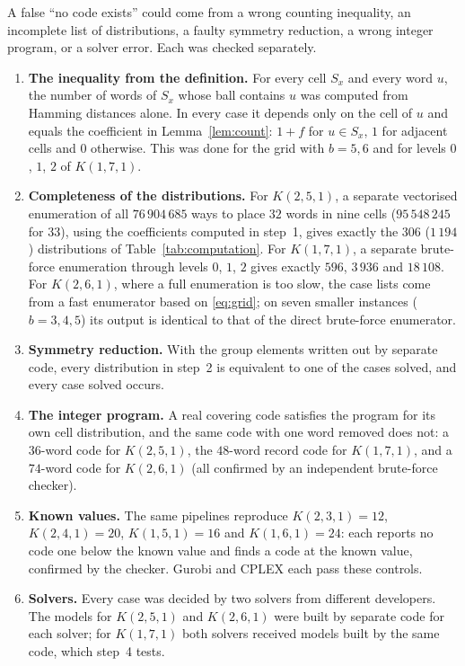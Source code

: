 \documentclass[11pt]{article}
\theoremstyle{remark}
\begin{document}
A false ``no code exists'' could come from a wrong counting inequality, an incomplete list of
distributions, a faulty symmetry reduction, a wrong integer program, or a solver error. Each was
checked separately.
\begin{enumerate}
\item \textbf{The inequality from the definition.} For every cell $S_x$ and every word $u$, the
  number of words of $S_x$ whose ball contains $u$ was computed from Hamming distances alone. In
  every case it depends only on the cell of $u$ and equals the coefficient in
  Lemma~\ref{lem:count}: $1+f$ for $u\in S_x$, $1$ for adjacent cells and $0$ otherwise. This was
  done for the grid with $b=5,6$ and for levels $0$, $1$, $2$ of $K(1,7,1)$.
\item \textbf{Completeness of the distributions.} For $K(2,5,1)$, a separate vectorised
  enumeration of all $76\,904\,685$ ways to place $32$ words in nine cells ($95\,548\,245$ for
  $33$), using the coefficients computed in step~1, gives exactly the $306$ ($1\,194$)
  distributions of Table~\ref{tab:computation}. For $K(1,7,1)$, a separate brute-force enumeration
  through levels $0$, $1$, $2$ gives exactly $596$, $3\,936$ and $18\,108$. For $K(2,6,1)$, where
  a full enumeration is too slow, the case lists come from a fast enumerator based on
  \eqref{eq:grid}; on seven smaller instances ($b=3,4,5$) its output is identical to that of the
  direct brute-force enumerator.
\item \textbf{Symmetry reduction.} With the group elements written out by separate code, every
  distribution in step~2 is equivalent to one of the cases solved, and every case solved occurs.
\item \textbf{The integer program.} A real covering code satisfies the program for its own cell
  distribution, and the same code with one word removed does not: a $36$-word code for
  $K(2,5,1)$, the $48$-word record code for $K(1,7,1)$, and a $74$-word code for $K(2,6,1)$
  (all confirmed by an independent brute-force checker).
\item \textbf{Known values.} The same pipelines reproduce $K(2,3,1)=12$, $K(2,4,1)=20$,
  $K(1,5,1)=16$ and $K(1,6,1)=24$: each reports no code one below the known value and finds a code
  at the known value, confirmed by the checker. Gurobi and CPLEX each pass these controls.
\item \textbf{Solvers.} Every case was decided by two solvers from different developers. The models
  for $K(2,5,1)$ and $K(2,6,1)$ were built by separate code for each solver; for $K(1,7,1)$ both
  solvers received models built by the same code, which step~4 tests.
\end{enumerate}
\end{document}
